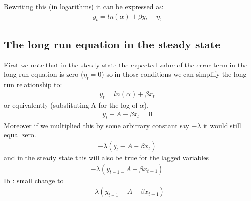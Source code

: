 \documentclass[letterpaper,10pt,english]{jupyterBook}
\begin{document}
\sphinxAtStartPar
Rewriting this (in logarithms) it can be expressed as:
\begin{equation*}
\begin{split}y_t = ln⁡(α) + βy_t + \eta_t\end{split}
\end{equation*}

\subsection{The long run equation in the steady state}
\label{\detokenize{content/06_WBModels/LoadingWBModel:the-long-run-equation-in-the-steady-state}}
\sphinxAtStartPar
First we note that in the steady state the expected value of the error term in the long run equation is zero (\(\eta_t=0 \)) so in those conditions we can simplify the long run relationship to:
\begin{equation*}
\begin{split}y_t=ln⁡(α)+\beta x_t\end{split}
\end{equation*}
\sphinxAtStartPar
or equivalently (substituting A for the log of \(\alpha\)).
\begin{equation*}
\begin{split}y_t-A-βx_t=0\end{split}
\end{equation*}
\sphinxAtStartPar
Moreover if we multiplied this by some arbitrary constant say \(-\lambda\) it would still equal zero.
\begin{equation*}
\begin{split}-\lambda(y_t -A-βx_t)\end{split}
\end{equation*}
\sphinxAtStartPar
and in the steady state this will also be true for the lagged variables
\begin{equation*}
\begin{split}-\lambda(y_{t-1-} A - βx_{t-1})\end{split}
\end{equation*}
\sphinxAtStartPar
Ib : small change to 
\begin{equation*}
\begin{split}-\lambda(y_{t-1} - A - βx_{t-1})\end{split}
\end{equation*}
\end{document}
